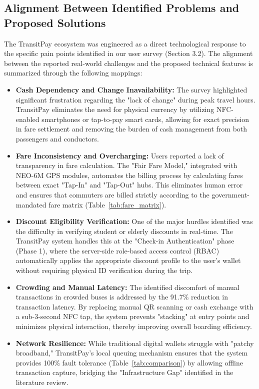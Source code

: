 \documentclass[manuscript,review,anonymous]{acmart}
\begin{document}
\subsection{Alignment Between Identified Problems and Proposed Solutions}

The TransitPay ecosystem was engineered as a direct technological response to the specific pain points identified in our user survey (Section 3.2). The alignment between the reported real-world challenges and the proposed technical features is summarized through the following mappings:

\begin{itemize}
    \item \textbf{Cash Dependency and Change Inavailability:} The survey highlighted significant frustration regarding the "lack of change" during peak travel hours. TransitPay eliminates the need for physical currency by utilizing NFC-enabled smartphones or tap-to-pay smart cards, allowing for exact precision in fare settlement and removing the burden of cash management from both passengers and conductors.
    
    \item \textbf{Fare Inconsistency and Overcharging:} Users reported a lack of transparency in fare calculation. The "Fair Fare Model," integrated with NEO-6M GPS modules, automates the billing process by calculating fares between exact "Tap-In" and "Tap-Out" hubs. This eliminates human error and ensures that commuters are billed strictly according to the government-mandated fare matrix (Table~\ref{tab:fare_matrix}).
    
    \item \textbf{Discount Eligibility Verification:} One of the major hurdles identified was the difficulty in verifying student or elderly discounts in real-time. The TransitPay system handles this at the "Check-in Authentication" phase (Phase 1), where the server-side role-based access control (RBAC) automatically applies the appropriate discount profile to the user's wallet without requiring physical ID verification during the trip.
    
    \item \textbf{Crowding and Manual Latency:} The identified discomfort of manual transactions in crowded buses is addressed by the 91.7\% reduction in transaction latency. By replacing manual QR scanning or cash exchange with a sub-3-second NFC tap, the system prevents "stacking" at entry points and minimizes physical interaction, thereby improving overall boarding efficiency.
    
    \item \textbf{Network Resilience:} While traditional digital wallets struggle with "patchy broadband," TransitPay's local queuing mechanism ensures that the system provides 100\% fault tolerance (Table~\ref{tab:comparison}) by allowing offline transaction capture, bridging the "Infrastructure Gap" identified in the literature review.
\end{itemize}
\end{document}

